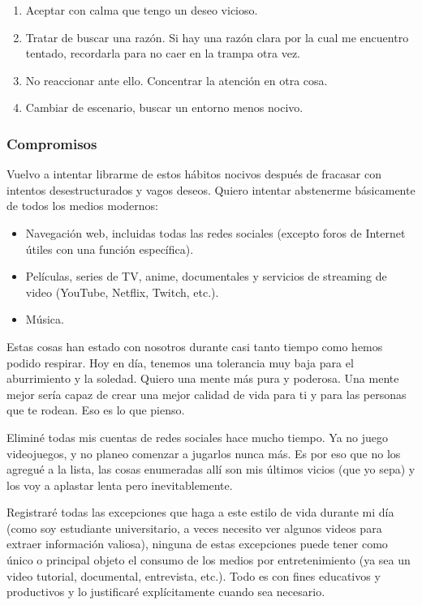 \documentclass[12pt]{article}
\begin{document}
	\begin{enumerate}
	\item Aceptar con calma que tengo un deseo vicioso.
	\item Tratar de buscar una razón. Si hay una razón clara por la cual me
		encuentro tentado, recordarla
	para no caer en la trampa otra vez.
	\item No reaccionar ante ello. Concentrar la atención en otra cosa.
	\item Cambiar de escenario, buscar un entorno menos nocivo.
	\end{enumerate}

	\subsubsection*{Compromisos}

	Vuelvo a intentar librarme de estos hábitos nocivos después de fracasar
	con intentos desestructurados y vagos deseos. Quiero intentar
	abstenerme básicamente de todos los medios modernos:

	\begin{itemize}
	\item Navegación web, incluidas todas las redes sociales (excepto foros
	de Internet útiles con una función específica).
	\item Películas, series de TV, anime, documentales y servicios de
	streaming de video (YouTube, Netflix, Twitch, etc.).
	\item Música.
	\end{itemize}

	Estas cosas han estado con nosotros durante casi tanto tiempo como hemos
	podido respirar. Hoy en día, tenemos una tolerancia muy baja para el
	aburrimiento y la soledad. Quiero una mente más pura y poderosa. Una
	mente mejor sería capaz de crear una mejor calidad de vida para ti y
	para las personas que te rodean. Eso es lo que pienso.

	Eliminé todas mis cuentas de redes sociales hace mucho tiempo. Ya no
	juego videojuegos, y no planeo comenzar a jugarlos nunca más. Es por
	eso que no los agregué a la lista, las cosas enumeradas allí son mis
	últimos vicios (que yo sepa) y los voy a aplastar lenta pero
	inevitablemente.

	Registraré todas las excepciones que haga a este estilo de vida durante
	mi día (como soy estudiante universitario, a veces necesito ver algunos
	videos para extraer información valiosa), ninguna de estas excepciones
	puede tener como único o principal objeto el consumo de los medios por
	entretenimiento (ya sea un video tutorial, documental, entrevista, etc.).
	Todo es con fines educativos y productivos y lo justificaré
	explícitamente cuando sea necesario.
\end{document}

